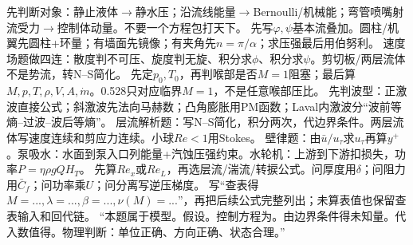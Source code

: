 先判断对象：静止液体$\to$静水压；沿流线能量$\to$Bernoulli/机械能；弯管喷嘴射流受力$\to$控制体动量。不要一个方程包打天下。
先写$\varphi,\psi$基本流叠加。圆柱/机翼先圆柱+环量；有墙面先镜像；有夹角先$n=\pi/\alpha$；求压强最后用伯努利。
速度场题做四连：散度判不可压、旋度判无旋、积分求$\phi$、积分求$\psi$。剪切板/两层流体不是势流，转N--S简化。
先定$p_0,T_0$，再判喉部是否$M=1$阻塞；最后算$M,p,T,\rho,V,A,\dot m$。0.528只对应临界$M=1$，不是任意喉部压比。
先判波型：正激波直接公式；斜激波先法向马赫数；凸角膨胀用PM函数；Laval内激波分“波前等熵--过波--波后等熵”。
层流解析题：写N--S简化，积分两次，代边界条件。两层流体写速度连续和剪应力连续。小球$Re<1$用Stokes。
壁律题：由$\bar u/u_\tau$求$u_\tau$再算$y^+$。泵吸水：水面到泵入口列能量+汽蚀压强约束。水轮机：上游到下游扣损失，功率$P=\eta\rho gQH_T$。
先算$Re_x$或$Re_L$，再选层流/湍流/转捩公式。问厚度用$\delta$；问阻力用$\bar C_f$；问功率乘$U$；问分离写逆压梯度。
写“查表得$M=...,\lambda=...,\beta=...,\nu(M)=...$”，再把后续公式完整列出；未算表值也保留查表输入和回代链。
“本题属于\underline{\hspace{1cm}}模型。假设\underline{\hspace{1cm}}。控制方程为\underline{\hspace{1cm}}。由边界条件\underline{\hspace{1cm}}得未知量。代入数值得\underline{\hspace{1cm}}。物理判断：单位正确、方向正确、状态合理。”

